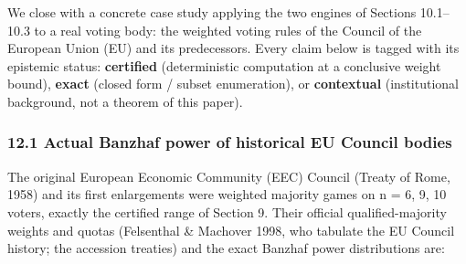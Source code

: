 \documentclass[
]{article}
\begin{document}
We close with a concrete case study applying the two engines of Sections
10.1--10.3 to a real voting body: the weighted voting rules of the
Council of the European Union (EU) and its predecessors. Every claim
below is tagged with its epistemic status: \textbf{certified}
(deterministic computation at a conclusive weight bound), \textbf{exact}
(closed form / subset enumeration), or \textbf{contextual}
(institutional background, not a theorem of this paper).

\subsubsection{12.1 Actual Banzhaf power of historical EU Council
bodies}\label{actual-banzhaf-power-of-historical-eu-council-bodies}

The original European Economic Community (EEC) Council (Treaty of Rome,
1958) and its first enlargements were weighted majority games on n = 6,
9, 10 voters, exactly the certified range of Section 9. Their official
qualified-majority weights and quotas (Felsenthal \& Machover 1998, who
tabulate the EU Council history; the accession treaties) and the exact
Banzhaf power distributions are:
\end{document}
